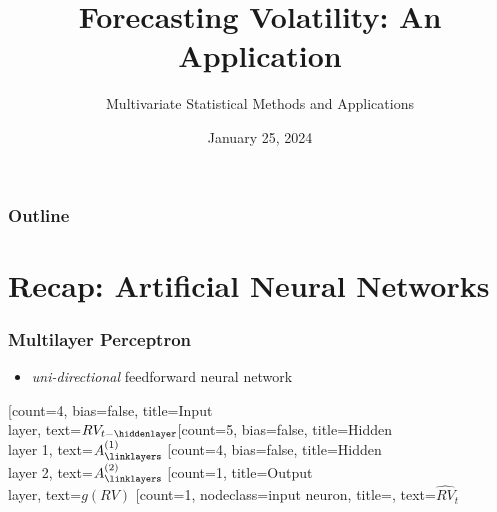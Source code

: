 \documentclass[handout]{beamer}
\title[Forecasting Volatility]{Forecasting Volatility: An Application} %
\author{Multivariate Statistical Methods and Applications} %
\institute[] %
{
\medskip
\text{Anatol Sluchych} %
}
\date{January 25, 2024} %
\begin{document}
\begin{frame}
\titlepage %
\end{frame}
\begin{frame}
\frametitle{Outline} 
\tableofcontents %
\end{frame}


\section{Recap: Artificial Neural Networks}

\begin{frame}
\frametitle{Multilayer Perceptron}
\begin{itemize}
    \item  \textit{uni-directional} feedforward neural network
\end{itemize}

\vspace{5mm}

\begin{neuralnetwork}[height=5]
\newcommand{\x}[2]{$RV_{t-#2}$}
\newcommand{\y}[2]{$g(RV)$}
\newcommand{\hone}[2]{$A^{(1)}_#2$}
\newcommand{\htwo}[2]{$A^{(2)}_#2$}
\newcommand{\w}[4]{$w_{#2#4}$}
\newcommand{\B}[4]{$\beta_#2$}
\newcommand{\naught}[4]{}
\newcommand{\nodetexty}[2]{$\widehat{RV}_t$}
\setdefaultlinklabel{\naught}
[count=4, bias=false, title=Input\\layer, text=\x]
\hiddenlayer[count=5, bias=false, title=Hidden\\layer 1, text=\hone]
\linklayers
\hiddenlayer[count=4, bias=false, title=Hidden\\layer 2, text=\htwo]
\linklayers
\outputlayer[count=1, title=Output\\layer,  text=\y] 
\linklayers
\outputlayer[count=1, nodeclass={input neuron}, title=\nodetexclear, text=\nodetexty]  
\linklayers
\end{neuralnetwork}
\end{frame}
\end{document}
